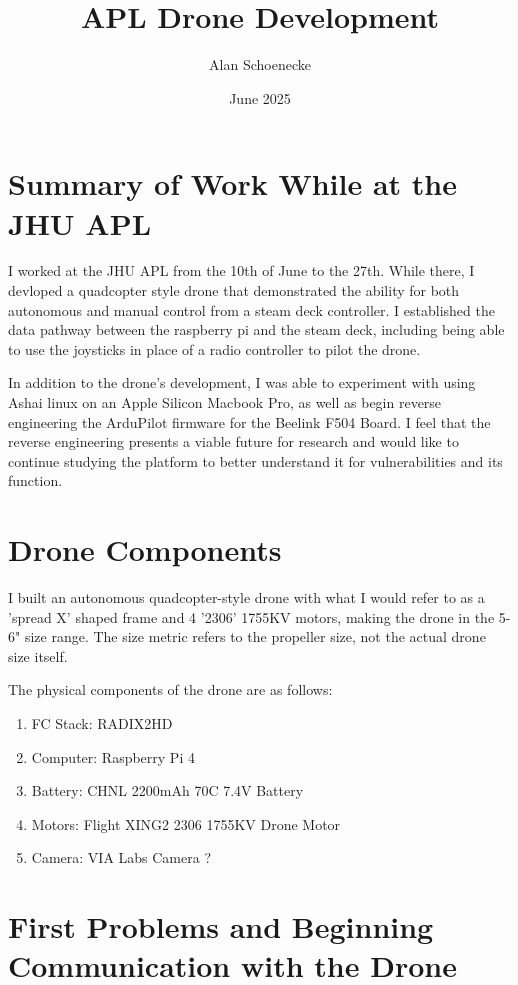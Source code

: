 \documentclass{article}
\title{APL Drone Development}
\author{Alan Schoenecke}
\date{June 2025}
\begin{document}
\maketitle
\tableofcontents
\pagebreak

\section{Summary of Work While at the JHU APL}
I worked at the JHU APL from the 10th of June to the 27th. While there, I devloped a quadcopter style drone that demonstrated the ability for both autonomous and manual control from a steam deck controller. I established the data pathway between the raspberry pi and the steam deck, including being able to use the joysticks in place of a radio controller to pilot the drone. 

In addition to the drone's development, I was able to experiment with using Ashai linux on an Apple Silicon Macbook Pro, as well as begin reverse engineering the ArduPilot firmware for the Beelink F504 Board. I feel that the reverse engineering presents a viable future for research and would like to continue studying the platform to better understand it for vulnerabilities and its function.



\section{Drone Components}
I built an autonomous quadcopter-style drone with what I would refer to as a 'spread X' shaped frame and 4 '2306' 1755KV motors, making the drone in the 5-6" size range. The size metric refers to the propeller size, not the actual drone size itself. 




The physical components of the drone are as follows:
\begin{enumerate}
    \item FC Stack: RADIX2HD
    \item Computer: Raspberry Pi 4 
    \item Battery: CHNL 2200mAh 70C 7.4V Battery 
    \item Motors: Flight XING2 2306 1755KV Drone Motor
    \item Camera: VIA Labs Camera ?
\end{enumerate}

\section{First Problems and Beginning Communication with the Drone}
\end{document}
